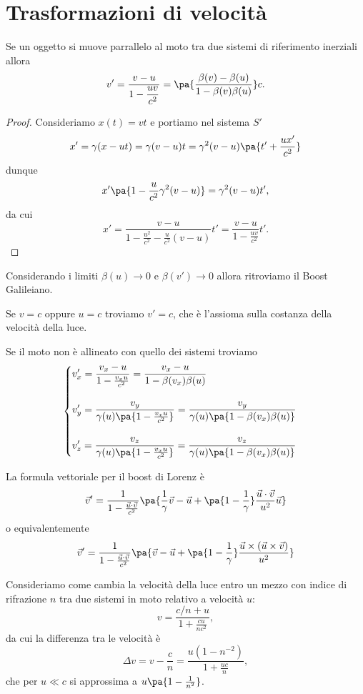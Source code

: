 \section{Trasformazioni di velocit\`a}
\begin{proposition}\label{FormulaBoost}
Se un oggetto si muove parrallelo al moto tra due sistemi di riferimento inerziali allora
\[v'=\dfrac{v-u}{\displaystyle 1-\frac{uv}{c^2}}=\pa{\frac{\beta(v)-\beta(u)}{1-\beta(v)\beta(u)}}c.\]
\end{proposition}
\begin{proof}
Consideriamo $x(t)=vt$ e portiamo nel sistema $S'$
\[x'=\gamma(x-ut)=\gamma(v-u)t=\gamma^2(v-u)\pa{t'+\frac{ux'}{c^2}}\]
dunque
\[x'\pa{1-\frac u{c^2}\gamma^2(v-u)}=\gamma^2(v-u)t',\]
da cui 
\[x'=\frac{v-u}{1-\frac{u^2}{c^2}-\frac u{c^2}(v-u)}t'=\frac{v-u}{1-\frac{uv}{c^2}}t'.\]
\end{proof}

\begin{remark}
Considerando i limiti $\beta(u)\to 0$ e $\beta(v')\to 0$ allora ritroviamo il Boost Galileiano.
\end{remark}

\begin{remark}
Se $v=c$ oppure $u=c$ troviamo $v'=c$, che \`e l'assioma sulla costanza della velocit\`a della luce.
\end{remark}

\begin{remark}
Se il moto non \`e allineato con quello dei sistemi troviamo
\[\begin{cases}
\displaystyle v_x'=\frac{v_x-u}{1-\frac{v_x u}{c^2}}=\frac{v_x-u}{1-\beta(v_x)\beta(u)}\\\\
\displaystyle v_y'=\dfrac{v_y}{\gamma(u)\pa{1-\frac{v_x u}{c^2}}}=\frac{v_y}{\gamma(u)\pa{1-\beta(v_x)\beta(u)}}\\\\
\displaystyle v_z'=\dfrac{v_z}{\gamma(u)\pa{1-\frac{v_x u}{c^2}}}=\frac{v_z}{\gamma(u)\pa{1-\beta(v_x)\beta(u)}}
\end{cases}\]
\end{remark}

\noindent La formula vettoriale per il boost di Lorenz \`e
\[\vec v'=\frac1{1-\frac{\vec u\cdot \vec v}{c^2}}\pa{\frac1\gamma \vec v-\vec u+\pa{1-\frac1\gamma}\frac{\vec u\cdot \vec v}{u^2}\vec u}\]
o equivalentemente
\[\vec v'=\frac1{1-\frac{\vec u\cdot \vec v}{c^2}}\pa{\vec v-\vec u+\pa{1-\frac1\gamma} \frac{\vec u\times (\vec u\times \vec v)}{u^2}}\]


\begin{example}
Consideriamo come cambia la velocit\`a della luce entro un mezzo con indice di rifrazione $n$ tra due sistemi in moto relativo a velocit\`a $u$:
\[v=\frac{c/n+u}{1+\frac{cu}{nc^2}},\]
da cui la differenza tra le velocit\`a \`e
\[\Delta v=v-\frac cn=\frac{u(1-n^{-2})}{1+\frac{uc}n},\]
che per $u\ll c$ si approssima a $u\pa{1-\frac1{n^2}}$.
\end{example}

